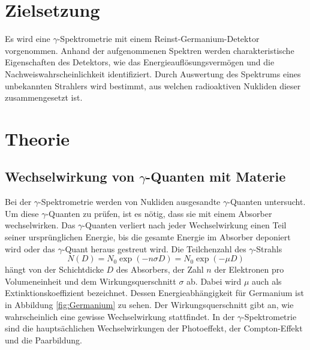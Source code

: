 \section{Zielsetzung}
\label{sec:Zielsetzung}
Es wird eine $\gamma$-Spektrometrie mit einem Reinst-Germanium-Detektor vorgenommen.
Anhand der aufgenommenen Spektren werden charakteristische Eigenschaften des Detektors, wie das Energieauflösungsvermögen und die Nachweiswahrscheinlichkeit identifiziert.
Durch Auswertung des Spektrums eines unbekannten Strahlers wird bestimmt, aus welchen radioaktiven Nukliden dieser zusammengesetzt ist.

\section{Theorie}
\label{sec:Theorie}

\subsection{Wechselwirkung von \texorpdfstring{$\gamma$}{gamma}-Quanten mit Materie}
Bei der $\gamma$-Spektrometrie werden von Nukliden ausgesandte $\gamma$-Quanten untersucht.
Um diese $\gamma$-Quanten zu prüfen, ist es nötig, dass sie mit einem Absorber wechselwirken.
Das $\gamma$-Quanten verliert nach jeder Wechselwirkung einen Teil seiner ursprünglichen Energie, bis die gesamte Energie im Absorber deponiert wird oder das $\gamma$-Quant heraus gestreut wird.
Die Teilchenzahl des $\gamma$-Strahls
\begin{equation}
  \label{eq:Absorbtion}
  N(D)=N_0\exp(-n\sigma D)=N_0\exp(-\mu D)
\end{equation}
hängt von der Schichtdicke $D$ des Absorbers, der Zahl $n$ der Elektronen pro Volumeneinheit und dem Wirkungsquerschnitt $\sigma$ ab. 
Dabei wird $\mu$ auch als Extinktionskoeffizient bezeichnet. Dessen Energieabhängigkeit für Germanium ist in Abbildung \ref{fig:Germanium} zu sehen.
Der Wirkungsquerschnitt gibt an, wie wahrscheinlich eine gewisse Wechselwirkung stattfindet.
In der $\gamma$-Spektrometrie sind die hauptsächlichen Wechselwirkungen der Photoeffekt, der Compton-Effekt und die Paarbildung.


